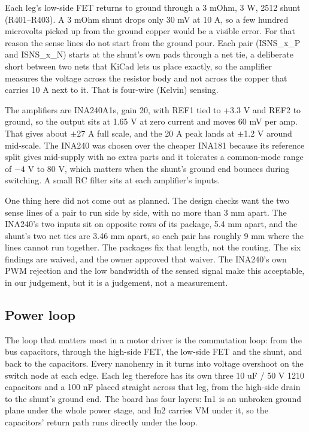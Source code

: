 Each leg's low-side FET returns to ground through a 3 mOhm, 3 W, 2512 shunt
(R401--R403). A 3 mOhm shunt drops only 30 mV at 10 A, so a few hundred
microvolts picked up from the ground copper would be a visible error. For that
reason the sense lines do not start from the ground pour. Each pair
(ISNS\_x\_P and ISNS\_x\_N) starts at the shunt's own pads through a net tie,
a deliberate short between two nets that KiCad lets us place exactly, so the
amplifier measures the voltage across the resistor body and not across the
copper that carries 10 A next to it. That is four-wire (Kelvin) sensing.

The amplifiers are INA240A1s, gain 20, with REF1 tied to +3.3 V and REF2 to
ground, so the output sits at 1.65 V at zero current and moves 60 mV per amp.
That gives about $\pm$27 A full scale, and the 20 A peak lands at
$\pm$1.2 V around mid-scale. The INA240 was chosen over the cheaper INA181 because
its reference split gives mid-supply with no extra parts and it tolerates a
common-mode range of $-4$ V to 80 V, which matters when the shunt's ground end
bounces during switching. A small RC filter sits at each amplifier's inputs.

One thing here did not come out as planned. The design checks want the two sense
lines of a pair to run side by side, with no more than 3 mm apart. The INA240's
two inputs sit on opposite rows of its package, 5.4 mm apart, and the shunt's
two net ties are 3.46 mm apart, so each pair has roughly 9 mm where the lines
cannot run together. The packages fix that length, not the routing. The six
findings are waived, and the owner approved that waiver. The INA240's own PWM
rejection and the low bandwidth of the sensed signal make this acceptable, in
our judgement, but it is a judgement, not a measurement.

\subsection*{Power loop}

The loop that matters most in a motor driver is the commutation loop: from the
bus capacitors, through the high-side FET, the low-side FET and the shunt, and
back to the capacitors. Every nanohenry in it turns into voltage overshoot on
the switch node at each edge. Each leg therefore has its own three 10 uF / 50 V
1210 capacitors and a 100 nF placed straight across that leg, from the
high-side drain to the shunt's ground end. The board has four layers: In1 is
an unbroken ground plane under the whole power stage, and In2 carries VM under
it, so the capacitors' return path runs directly under the loop.

